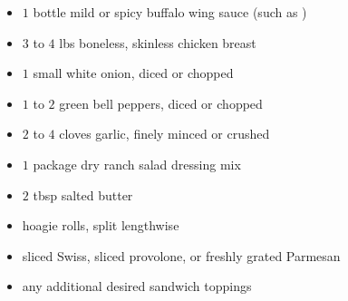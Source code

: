 
\RequirePackage{../recipe}




\thispagestyle{firstpage}

\ingredients
\begin{minipage}{\textwidth}
\begin{multicols*}{2}
\begin{itemize}
    \item $1$ bottle mild or spicy buffalo wing sauce (such as )
    \item $3$ to $4$ lbs boneless, skinless chicken breast
    \item $1$ small white onion, diced or chopped
    \item $1$ to $2$ green bell peppers, diced or chopped
    \item $2$ to $4$ cloves garlic, finely minced or crushed
    \item $1$ package dry ranch salad dressing mix
    \item $2$ tbsp salted butter
\end{itemize}
\columnbreak
\ingredients[Sandwich]
\begin{itemize}
    \item hoagie rolls, split lengthwise
    \item sliced Swiss, sliced provolone, or freshly grated Parmesan
    \item any additional desired sandwich toppings
\end{itemize}
\end{multicols*}
\end{minipage}
\vspace{1em}

